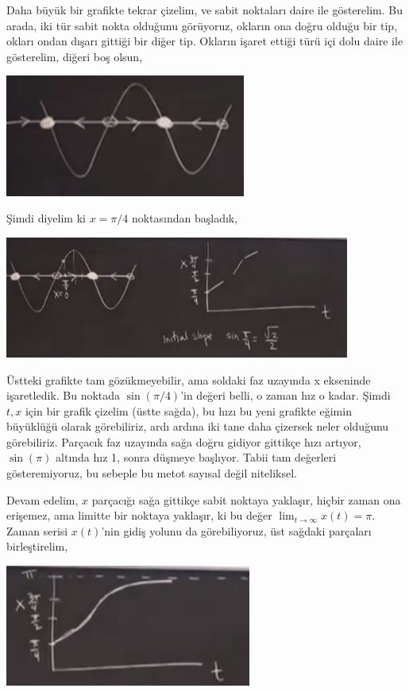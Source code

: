 \documentclass[12pt,fleqn]{article}\usepackage{../../common}
\begin{document}
Daha büyük bir grafikte tekrar çizelim, ve sabit noktaları daire ile
gösterelim. Bu arada, iki tür sabit nokta olduğunu görüyoruz, okların ona
doğru olduğu bir tip, okları ondan dışarı gittiği bir diğer tip. Okların
işaret ettiği türü içi dolu daire ile gösterelim, diğeri boş olsun,

\includegraphics[height=4cm]{1_05.png}

Şimdi diyelim ki $x=\pi/4$ noktasından başladık, 

\includegraphics[height=4cm]{1_06.png}

Üstteki grafikte tam gözükmeyebilir, ama soldaki faz uzayında x ekseninde
işaretledik. Bu noktada $\sin(\pi/4)$'in değeri belli, o zaman hız o
kadar. Şimdi $t,x$ için bir grafik çizelim (üstte sağda), bu hızı bu yeni
grafikte eğimin büyüklüğü olarak görebiliriz, ardı ardına iki tane daha
çizersek neler olduğunu görebiliriz. Parçacık faz uzayında sağa doğru
gidiyor gittikçe hızı artıyor, $\sin(\pi)$ altında hız 1, sonra düşmeye
başlıyor. Tabii tam değerleri gösteremiyoruz, bu sebeple bu metot
sayısal değil niteliksel. 

Devam edelim, $x$ parçacığı sağa gittikçe sabit noktaya yaklaşır, hiçbir
zaman ona erişemez, ama limitte bir noktaya yaklaşır, ki bu değer $\lim_{t
  \to \infty} x(t) = \pi$. Zaman serisi $x(t)$'nin gidiş yolunu da
görebiliyoruz,  üst sağdaki parçaları birleştirelim, 

\includegraphics[height=4cm]{1_07.png}
\end{document}
